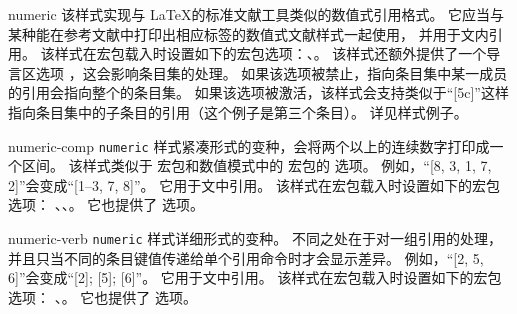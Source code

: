 \begin{marglist}

\item[numeric]
该样式实现与 \LaTeX 的标准文献工具类似的数值式引用格式。
它应当与某种能在参考文献中打印出相应标签的数值式文献样式一起使用，
并用于文内引用。
该样式在宏包载入时设置如下的宏包选项：、。
该样式还额外提供了一个导言区选项 ，这会影响条目集的处理。
如果该选项被禁止，指向条目集中某一成员的引用会指向整个的条目集。
如果该选项被激活，该样式会支持类似于“[5c]”这样指向条目集中的子条目的引用（这个例子是第三个条目）。
详见样式例子。

\item[numeric-comp]
\texttt{numeric} 样式紧凑形式的变种，会将两个以上的连续数字打印成一个区间。
该样式类似于  宏包和数值模式中的  宏包的  选项。
例如，“[8, 3, 1, 7, 2]”会变成“[1--3, 7, 8]”。
它用于文中引用。
该样式在宏包载入时设置如下的宏包选项：
、、。
它也提供了  选项。

\item[numeric-verb]
\texttt{numeric} 样式详细形式的变种。
不同之处在于对一组引用的处理，
并且只当不同的条目键值传递给单个引用命令时才会显示差异。
例如，“[2, 5, 6]”会变成“[2]; [5]; [6]”。
它用于文中引用。
该样式在宏包载入时设置如下的宏包选项：
、。
它也提供了  选项。


\end{marglist}
